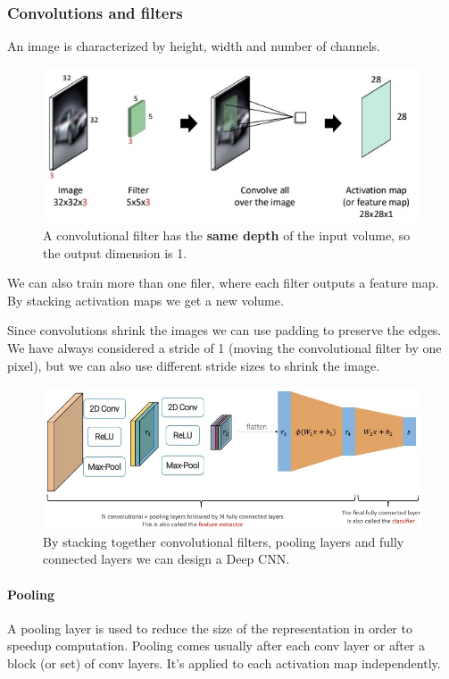 \documentclass{article}
\begin{document}
\subsubsection{Convolutions and filters}
An image is characterized by height, width and number of channels.

\begin{figure}[htbp]
  \centering
  \includegraphics[width=0.8\linewidth]{./img/convolution_filter.jpg}
  \caption{A convolutional filter has the \textbf{same depth} of the input volume, so the output dimension is 1.}
\end{figure}

We can also train more than one filer, where each filter outputs a feature map.
By stacking activation maps we get a new volume.

Since convolutions shrink the images we can use padding to preserve the edges.
We have always considered a stride of 1 (moving the convolutional filter by one pixel), but we can also use different stride sizes to shrink the image.

\begin{figure}[htbp]
  \centering
  \includegraphics[width=0.8\linewidth]{./img/deep_cnn.jpg}
  \caption{By stacking together convolutional filters, pooling layers and fully connected layers we can design a Deep CNN.}
\end{figure}

\paragraph{Pooling}
A pooling layer is used to reduce the size of the representation in order to speedup computation.
Pooling comes usually after each conv layer or after a block (or set) of conv layers.
It's applied to each activation map independently.
\end{document}
